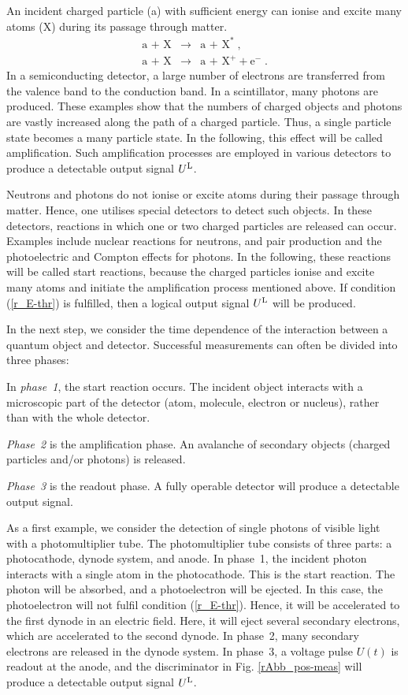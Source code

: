 \documentclass[12pt]{article}
\begin{document}
An incident charged particle (a) with sufficient energy can ionise and excite many atoms (X) during its passage through matter.  
%
\begin{eqnarray}
\mbox{a + X} & \to & \mbox{a + X}^* \;,  \label{r_Anrg}\\
\mbox{a + X} & \to & \mbox{a + X}^+ + \mbox{e}^- \;.   \label{r_Ionis}
\end{eqnarray}
%
In a semiconducting detector, a large number of electrons are transferred from the valence band to the conduction band.  
In a scintillator, many photons are produced.  
These examples show that the numbers of charged objects and photons are vastly increased along the path of a charged particle.  
Thus, a single particle state becomes a many particle state.  
In the following, this effect will be called amplification.  
Such amplification processes are employed in various detectors to produce a detectable output signal $U^{\rm L}$.  

Neutrons and photons do not ionise or excite atoms during their passage through matter.  Hence, one utilises special detectors to detect such objects.  
In these detectors, reactions in which one or two charged particles are released can occur.  
Examples include nuclear reactions for neutrons, and pair production and the photoelectric and Compton effects for photons.  
In the following, these reactions will be called start reactions, because the charged particles ionise and excite many atoms and initiate the amplification process mentioned above.  If condition (\ref{r_E-thr}) is fulfilled, then a logical output signal $U^{\rm L}$ will be produced.  

In the next step, we consider the time dependence of the interaction between a quantum object and detector.  
Successful measurements can often be divided into three phases:  

In \emph{phase~1}, the start reaction occurs.  
The incident object interacts with a microscopic part of the detector (atom, molecule, electron or nucleus), rather than with the whole detector.  

\emph{Phase~2} is the amplification phase. An avalanche of secondary objects (charged particles and/or photons) is released.  

\emph{Phase~3} is the readout phase. A fully operable detector will produce a detectable output signal.  

As a first example, we consider the detection of single photons of visible light with a photomultiplier tube.  The photomultiplier tube consists of three parts: a photocathode, dynode system, and anode.  
In phase~1, the incident photon interacts with a single atom in the photocathode.  This is the start reaction.  
The photon will be absorbed, and a photoelectron will be ejected.  
In this case, the photoelectron will not fulfil condition (\ref{r_E-thr}).  
Hence, it will be accelerated to the first dynode in an electric field.  
Here, it will eject several secondary electrons, which are accelerated to the second dynode.  
In phase~2, many secondary electrons are released in the dynode system.  In phase~3, a voltage pulse $U(t)$ is readout at the anode, and the discriminator in Fig. \ref{rAbb_pos-meas} will produce a detectable output signal $U^{\rm L}$.  
\end{document}

